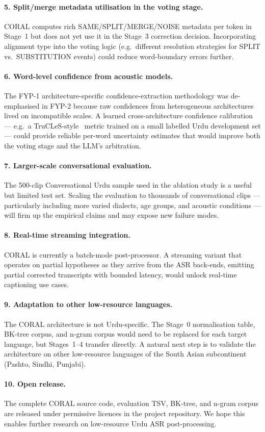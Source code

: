 \paragraph{5. Split/merge metadata utilisation in the voting stage.}
CORAL computes rich SAME/SPLIT/MERGE/NOISE metadata per token in Stage~1 but does not yet use it in the Stage~3 correction decision. Incorporating alignment type into the voting logic (e.g.\ different resolution strategies for SPLIT vs.\ SUBSTITUTION events) could reduce word-boundary errors further.

\paragraph{6. Word-level confidence from acoustic models.}
The FYP-1 architecture-specific confidence-extraction methodology was de-emphasised in FYP-2 because raw confidences from heterogeneous architectures lived on incompatible scales. A learned cross-architecture confidence calibration --- e.g.\ a TruCLeS-style~\cite{trucles2025} metric trained on a small labelled Urdu development set --- could provide reliable per-word uncertainty estimates that would improve both the voting stage and the LLM's arbitration.

\paragraph{7. Larger-scale conversational evaluation.}
The 500-clip Conversational Urdu sample used in the ablation study is a useful but limited test set. Scaling the evaluation to thousands of conversational clips --- particularly including more varied dialects, age groups, and acoustic conditions --- will firm up the empirical claims and may expose new failure modes.

\paragraph{8. Real-time streaming integration.}
CORAL is currently a batch-mode post-processor. A streaming variant that operates on partial hypotheses as they arrive from the ASR back-ends, emitting partial corrected transcripts with bounded latency, would unlock real-time captioning use cases.

\paragraph{9. Adaptation to other low-resource languages.}
The CORAL architecture is not Urdu-specific. The Stage~0 normalisation table, BK-tree corpus, and n-gram corpus would need to be replaced for each target language, but Stages~1--4 transfer directly. A natural next step is to validate the architecture on other low-resource languages of the South Asian subcontinent (Pashto, Sindhi, Punjabi).

\paragraph{10. Open release.}
The complete CORAL source code, evaluation TSV, BK-tree, and n-gram corpus are released under permissive licences in the project repository. We hope this enables further research on low-resource Urdu ASR post-processing.
